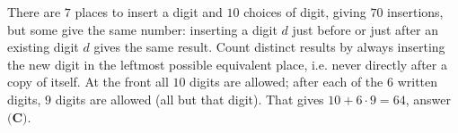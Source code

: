 There are $7$ places to insert a digit and $10$ choices of digit, giving $70$ insertions, but some give the same number: inserting a digit $d$ just before or just after an existing digit $d$ gives the same result. Count distinct results by always inserting the new digit in the leftmost possible equivalent place, i.e. never directly after a copy of itself. At the front all $10$ digits are allowed; after each of the $6$ written digits, $9$ digits are allowed (all but that digit). That gives $10+6\cdot9=\boxed{64}$, answer $\textbf{(C)}$.
